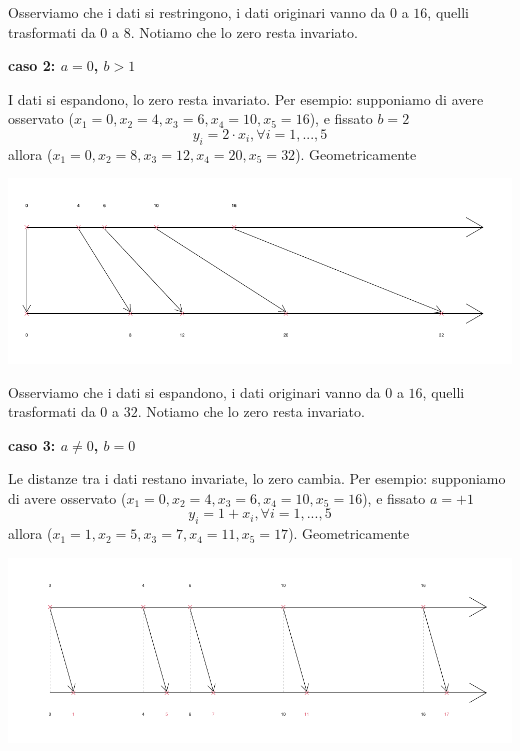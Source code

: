 \documentclass[
  11pt,
]{book}
\theoremstyle{mytheoremstyle}
\theoremstyle{mydefstyle}
\begin{document}
Osserviamo che i dati si restringono, i dati originari vanno da \(0\) a \(16\), quelli trasformati da \(0\) a \(8\). Notiamo che lo zero resta invariato.

\textbf{caso 2: \(a= 0\), \(b>1\)}

I dati si espandono, lo zero resta invariato.
Per esempio: supponiamo di avere osservato (\(x_1=0, x_2=4, x_3=6, x_4=10, x_5=16\)), e fissato \(b=2\)
\[
y_i= 2\cdot x_i, \forall i = 1,...,5
\]
allora (\(x_1=0, x_2=8, x_3=12, x_4=20, x_5=32\)). Geometricamente

\begin{center}\includegraphics{Appunti_di_Statistica_2025_files/figure-latex/tranf-lin-gr2-1} \end{center}

Osserviamo che i dati si espandono, i dati originari vanno da \(0\) a \(16\), quelli trasformati da \(0\) a \(32\). Notiamo che lo zero resta invariato.

\textbf{caso 3: \(a\ne 0\), \(b=0\)}

Le distanze tra i dati restano invariate, lo zero cambia.
Per esempio: supponiamo di avere osservato (\(x_1=0, x_2=4, x_3=6, x_4=10, x_5=16\)), e fissato \(a=+1\)
\[
y_i= 1 + x_i, \forall i = 1,...,5
\]
allora (\(x_1=1, x_2=5, x_3=7, x_4=11, x_5=17\)). Geometricamente

\begin{center}\includegraphics{Appunti_di_Statistica_2025_files/figure-latex/tranf-lin-gr3-1} \end{center}
\end{document}
